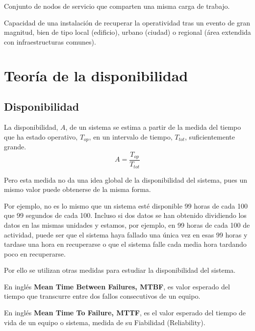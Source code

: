 \begin{defn}\label{cluster:HP}
Conjunto de nodos de servicio que comparten una misma carga de trabajo.
\end{defn}

\begin{defn}
Capacidad de una instalación de
recuperar la operatividad tras un evento de gran magnitud, bien de tipo local (edificio), urbano (ciudad) o regional (área extendida con infraestructuras comunes).
\end{defn}

\section{Teoría de la disponibilidad}
\subsection{Disponibilidad}
La disponibilidad, $A$, de un sistema se estima a partir de la medida del tiempo que ha estado operativo, $T_{op}$, en un intervalo de tiempo, $T_{tot}$, suficientemente grande.
\[A= \frac{T_{op}}{T_{tot}}\]

Pero esta medida no da una idea global de la disponibilidad del sistema, pues un mismo valor puede obtenerse de la misma forma.

Por ejemplo, no es lo mismo que un sistema esté disponible 99 horas de cada 100 que 99 segundos de cada 100. Incluso si dos datos se han obtenido dividiendo los datos en las mismas unidades y estamos, por ejemplo, en 99 horas de cada 100 de actividad, puede ser que el sistema haya fallado una única vez en esas 99 horas y tardase una hora en recuperarse o que el sistema falle cada media hora tardando poco en recuperarse.

Por ello se utilizan otras medidas para estudiar la disponibilidad del sistema.

\begin{defn}

En inglés \textbf{Mean Time Between Failures, MTBF}, es valor esperado del tiempo que transcurre entre dos fallos consecutivos de un equipo.
\end{defn}

\begin{defn}

En inglés \textbf{Mean Time To Failure, MTTF}, es el valor esperado del tiempo de vida de un equipo o sistema, medida de su Fiabilidad (Reliability).
\end{defn}

